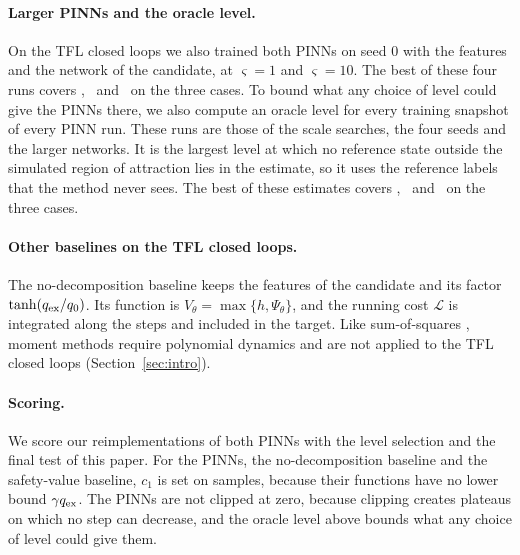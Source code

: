 \paragraph{Larger PINNs and the oracle level.} On the TFL closed loops we also trained both PINNs on seed 0 with the features and the network of the candidate, at $\varsigma=1$ and $\varsigma=10$. The best of these four runs covers \resRichMaxCirc, \resRichMaxSin\ and \resRichMaxQuad\ on the three cases. To bound what any choice of level could give the PINNs there, we also compute an oracle level for every training snapshot of every PINN run. These runs are those of the scale searches, the four seeds and the larger networks. It is the largest level at which no reference state outside the simulated region of attraction lies in the estimate, so it uses the reference labels that the method never sees. The best of these estimates covers \resOracleMaxCirc, \resOracleMaxSin\ and \resOracleMaxQuad\ on the three cases.

\paragraph{Other baselines on the TFL closed loops.} The no-decomposition baseline keeps the features of the candidate and its factor $\tanh(q_{\mathrm{ex}}/q_0)$. Its function is $V_\theta=\max\{h,\Psi_\theta\}$, and the running cost $\mathcal L$ is integrated along the steps and included in the target. Like sum-of-squares \citep{xue2020}, moment methods \citep{korda2013} require polynomial dynamics and are not applied to the TFL closed loops (Section~\ref{sec:intro}).

\paragraph{Scoring.} We score our reimplementations of both PINNs with the level selection and the final test of this paper. For the PINNs, the no-decomposition baseline and the safety-value baseline, $c_1$ is set on samples, because their functions have no lower bound $\gamma q_{\mathrm{ex}}$. The PINNs are not clipped at zero, because clipping creates plateaus on which no step can decrease, and the oracle level above bounds what any choice of level could give them.

